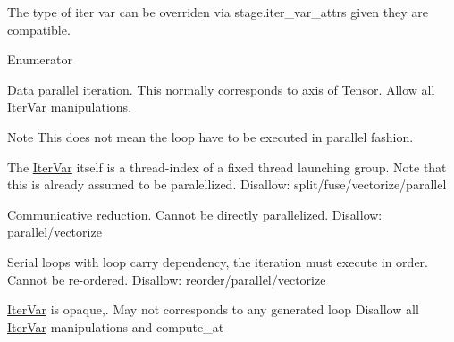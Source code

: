 The type of iter var can be overriden via stage.\+iter\+\_\+var\+\_\+attrs given they are compatible. \begin{Desc}
\item[Enumerator]\par
\begin{description}
\item[{\em 
k\+Data\+Par\hypertarget{namespacetvm_1_1tir_add7d0a6b1dd91f0c3c5dd2f4cf64358ea943fcb20375772edb59ea948f6cc9422}{}\label{namespacetvm_1_1tir_add7d0a6b1dd91f0c3c5dd2f4cf64358ea943fcb20375772edb59ea948f6cc9422}
}]Data parallel iteration. This normally corresponds to axis of Tensor. Allow all \hyperlink{classtvm_1_1tir_1_1IterVar}{Iter\+Var} manipulations. \begin{DoxyNote}{Note}
This does not mean the loop have to be executed in parallel fashion. 
\end{DoxyNote}
\item[{\em 
k\+Thread\+Index\hypertarget{namespacetvm_1_1tir_add7d0a6b1dd91f0c3c5dd2f4cf64358ea2758d2f7912af847eff77105023a25d0}{}\label{namespacetvm_1_1tir_add7d0a6b1dd91f0c3c5dd2f4cf64358ea2758d2f7912af847eff77105023a25d0}
}]The \hyperlink{classtvm_1_1tir_1_1IterVar}{Iter\+Var} itself is a thread-\/index of a fixed thread launching group. Note that this is already assumed to be paralellized. Disallow\+: split/fuse/vectorize/parallel \item[{\em 
k\+Comm\+Reduce\hypertarget{namespacetvm_1_1tir_add7d0a6b1dd91f0c3c5dd2f4cf64358eac78682fe1cb0a6de8511f2fc5144c0b4}{}\label{namespacetvm_1_1tir_add7d0a6b1dd91f0c3c5dd2f4cf64358eac78682fe1cb0a6de8511f2fc5144c0b4}
}]Communicative reduction. Cannot be directly parallelized. Disallow\+: parallel/vectorize \item[{\em 
k\+Ordered\hypertarget{namespacetvm_1_1tir_add7d0a6b1dd91f0c3c5dd2f4cf64358eaba48cf32065b1bf9086138313912f64b}{}\label{namespacetvm_1_1tir_add7d0a6b1dd91f0c3c5dd2f4cf64358eaba48cf32065b1bf9086138313912f64b}
}]Serial loops with loop carry dependency, the iteration must execute in order. Cannot be re-\/ordered. Disallow\+: reorder/parallel/vectorize \item[{\em 
k\+Opaque\hypertarget{namespacetvm_1_1tir_add7d0a6b1dd91f0c3c5dd2f4cf64358eaf324873e6195114a186db7f910559b2c}{}\label{namespacetvm_1_1tir_add7d0a6b1dd91f0c3c5dd2f4cf64358eaf324873e6195114a186db7f910559b2c}
}]\hyperlink{classtvm_1_1tir_1_1IterVar}{Iter\+Var} is opaque,. May not corresponds to any generated loop Disallow all \hyperlink{classtvm_1_1tir_1_1IterVar}{Iter\+Var} manipulations and compute\+\_\+at


\end{description}
\end{Desc}
